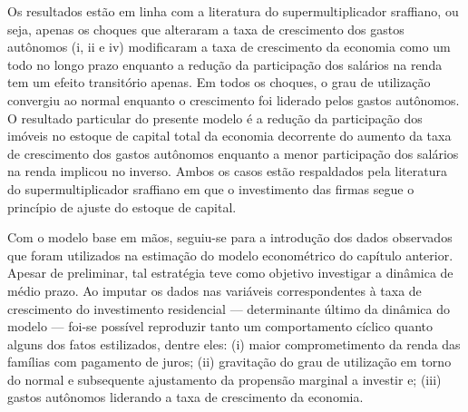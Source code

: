 Os resultados estão em linha com a literatura do supermultiplicador sraffiano, ou seja, apenas os choques que alteraram a taxa de crescimento dos gastos autônomos (i, ii e iv) modificaram a taxa de crescimento da economia como um todo no longo prazo enquanto a redução da participação dos salários na renda tem um efeito transitório apenas.
Em todos os choques, o grau de utilização convergiu ao normal enquanto o crescimento foi liderado pelos gastos autônomos.
O resultado particular do presente modelo é a redução da participação dos imóveis no estoque de capital total da economia decorrente do aumento da taxa de crescimento dos gastos autônomos enquanto a menor participação dos salários na renda implicou no inverso.
Ambos os casos estão respaldados pela literatura do supermultiplicador sraffiano em que o investimento das firmas segue o princípio de ajuste do estoque de capital.


Com o modelo base em mãos, seguiu-se para a introdução dos dados observados que foram utilizados na estimação do modelo econométrico do capítulo anterior.
Apesar de preliminar, tal estratégia teve como objetivo investigar a dinâmica de médio prazo.
Ao imputar os dados nas variáveis correspondentes à taxa de crescimento do investimento residencial --- determinante último da dinâmica do modelo --- foi-se possível reproduzir tanto um comportamento cíclico quanto alguns dos fatos estilizados, dentre eles: (i) maior comprometimento da renda das famílias com pagamento de juros; (ii) gravitação do grau de utilização em torno do normal e subsequente ajustamento da propensão marginal a investir e; (iii) gastos autônomos liderando a taxa de crescimento da economia.


